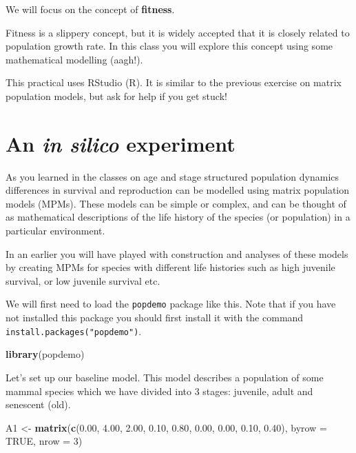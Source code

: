 \documentclass[
  a4paper]{book}
\newenvironment{Shaded}{\begin{snugshade}}{\end{snugshade}}
\newcommand{\AttributeTok}[1]{\textcolor[rgb]{0.13,0.29,0.53}{#1}}
\newcommand{\ConstantTok}[1]{\textcolor[rgb]{0.56,0.35,0.01}{#1}}
\newcommand{\DecValTok}[1]{\textcolor[rgb]{0.00,0.00,0.81}{#1}}
\newcommand{\FloatTok}[1]{\textcolor[rgb]{0.00,0.00,0.81}{#1}}
\newcommand{\FunctionTok}[1]{\textcolor[rgb]{0.13,0.29,0.53}{\textbf{#1}}}
\newcommand{\NormalTok}[1]{#1}
\newcommand{\OtherTok}[1]{\textcolor[rgb]{0.56,0.35,0.01}{#1}}
\begin{document}
We will focus on the concept of \textbf{fitness}.

Fitness is a slippery concept, but it is widely accepted that it is closely related to population growth rate. In this class you will explore this concept using some mathematical modelling (aagh!).

\begin{do-something}
This practical uses RStudio (R). It is similar to the previous exercise
on matrix population models, but ask for help if you get stuck!
\end{do-something}

\hypertarget{an-in-silico-experiment}{%
\section{\texorpdfstring{An \emph{in silico} experiment}{An in silico experiment}}\label{an-in-silico-experiment}}

As you learned in the classes on age and stage structured population dynamics differences in survival and reproduction can be modelled using matrix population models (MPMs). These models can be simple or complex, and can be thought of as mathematical descriptions of the life history of the species (or population) in a particular environment.

In an earlier you will have played with construction and analyses of these models by creating MPMs for species with different life histories such as high juvenile survival, or low juvenile survival etc.

We will first need to load the \texttt{popdemo} package like this. Note that if you have not installed this package you should first install it with the command \texttt{install.packages("popdemo")}.

\begin{Shaded}
\begin{Highlighting}[]
\FunctionTok{library}\NormalTok{(popdemo)}
\end{Highlighting}
\end{Shaded}

Let's set up our baseline model. This model describes a population of some mammal species which we have divided into 3 stages: juvenile, adult and senescent (old).

\begin{Shaded}
\begin{Highlighting}[]
\NormalTok{A1 }\OtherTok{\textless{}{-}} \FunctionTok{matrix}\NormalTok{(}\FunctionTok{c}\NormalTok{(}\FloatTok{0.00}\NormalTok{, }\FloatTok{4.00}\NormalTok{, }\FloatTok{2.00}\NormalTok{, }
               \FloatTok{0.10}\NormalTok{, }\FloatTok{0.80}\NormalTok{, }\FloatTok{0.00}\NormalTok{, }
               \FloatTok{0.00}\NormalTok{, }\FloatTok{0.10}\NormalTok{, }\FloatTok{0.40}\NormalTok{), }
            \AttributeTok{byrow =} \ConstantTok{TRUE}\NormalTok{, }\AttributeTok{nrow =} \DecValTok{3}\NormalTok{)}
\end{Highlighting}
\end{Shaded}
\end{document}

